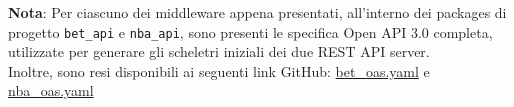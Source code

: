 \noindent \textbf{Nota}: Per ciascuno dei middleware appena presentati, all'interno dei packages di progetto \texttt{bet\_api} e \texttt{nba\_api}, sono presenti le specifica Open API 3.0 completa, utilizzate per generare gli scheletri iniziali dei due REST API server.\\
Inoltre, sono resi disponibili ai seguenti link GitHub: \href{https://github.com/RiccardoBarbieri/fanta_nba/blob/master/bet_api/bet_oas.yaml}{bet\_oas.yaml} e \href{https://github.com/RiccardoBarbieri/fanta_nba/blob/master/nba_api/nba_oas.yaml}{nba\_oas.yaml}
\newpage